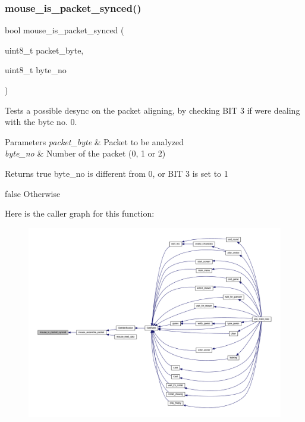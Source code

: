 \subsubsection{\texorpdfstring{mouse\+\_\+is\+\_\+packet\+\_\+synced()}{mouse\_is\_packet\_synced()}}
{\footnotesize\ttfamily bool mouse\+\_\+is\+\_\+packet\+\_\+synced (\begin{DoxyParamCaption}\item[{uint8\+\_\+t}]{packet\+\_\+byte,  }\item[{uint8\+\_\+t}]{byte\+\_\+no }\end{DoxyParamCaption})}



Tests a possible desync on the packet aligning, by checking B\+IT 3 if we\textquotesingle{}re dealing with the byte no. 0. 


\begin{DoxyParams}{Parameters}
{\em packet\+\_\+byte} & Packet to be analyzed \\
\hline
{\em byte\+\_\+no} & Number of the packet (0, 1 or 2) \\
\hline
\end{DoxyParams}
\begin{DoxyReturn}{Returns}
true byte\+\_\+no is different from 0, or B\+IT 3 is set to 1 

false Otherwise 
\end{DoxyReturn}
Here is the caller graph for this function\+:\nopagebreak
\begin{figure}[H]
\begin{center}
\leavevmode
\includegraphics[width=350pt]{group__mouse_ga3d0c72c442c9903f8ca9e71fe973883a_icgraph}
\end{center}
\end{figure}
\mbox{\label{group__mouse_ga0eb4568033242c6785c4e2c48a77c927}} 
